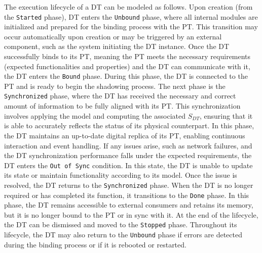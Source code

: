 The execution lifecycle of a DT can be modeled as follows.
Upon creation (from the \texttt{Started} phase), DT enters the \texttt{Unbound} phase, where all internal modules are initialized and prepared for the binding process with the PT.
This transition may occur automatically upon creation or may be triggered by an external component, such as the system initiating the DT instance.
Once the DT successfully binds to its PT, meaning the PT meets the necessary requirements (expected functionalities and properties) and the DT can communicate with it, the DT enters the \texttt{Bound} phase. During this phase, the DT is connected to the PT and is ready to begin the shadowing process.
The next phase is the \texttt{Synchronized} phase, where the DT has received the necessary and correct amount of information to be fully aligned with its PT.
This synchronization involves applying the model and computing the associated $S_{DT}$, ensuring that it is able to accurately reflects the status of its physical counterpart.
In this phase, the DT maintains an up-to-date digital replica of its PT, enabling continuous interaction and event handling.
If any issues arise, such as network failures, and the DT synchronization performance falls under the expected requirements, the DT enters the \texttt{Out of Sync} condition.
In this state, the DT is unable to update its state or maintain functionality according to its model.
Once the issue is resolved, the DT returns to the \texttt{Synchronized} phase.
When the DT is no longer required or has completed its function, it transitions to the \texttt{Done} phase.
In this phase, the DT remains accessible to external consumers and retains its memory, but it is no longer bound to the PT or in sync with it. At the end of the lifecycle, the DT can be dismissed and moved to the \texttt{Stopped} phase.
Throughout its lifecycle, the DT may also return to the \texttt{Unbound} phase if errors are detected during the binding process or if it is rebooted or restarted.


